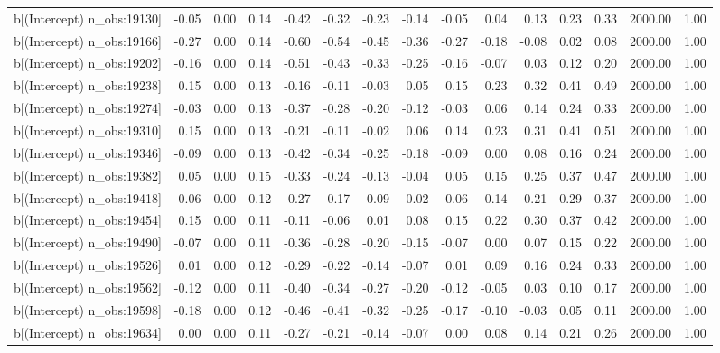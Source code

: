 \begin{table}[ht]
\begin{tabular}{rrrrrrrrrrrrrrr}
  b[(Intercept) n\_obs:19130] & -0.05 & 0.00 & 0.14 & -0.42 & -0.32 & -0.23 & -0.14 & -0.05 & 0.04 & 0.13 & 0.23 & 0.33 & 2000.00 & 1.00 \\ 
  b[(Intercept) n\_obs:19166] & -0.27 & 0.00 & 0.14 & -0.60 & -0.54 & -0.45 & -0.36 & -0.27 & -0.18 & -0.08 & 0.02 & 0.08 & 2000.00 & 1.00 \\ 
  b[(Intercept) n\_obs:19202] & -0.16 & 0.00 & 0.14 & -0.51 & -0.43 & -0.33 & -0.25 & -0.16 & -0.07 & 0.03 & 0.12 & 0.20 & 2000.00 & 1.00 \\ 
  b[(Intercept) n\_obs:19238] & 0.15 & 0.00 & 0.13 & -0.16 & -0.11 & -0.03 & 0.05 & 0.15 & 0.23 & 0.32 & 0.41 & 0.49 & 2000.00 & 1.00 \\ 
  b[(Intercept) n\_obs:19274] & -0.03 & 0.00 & 0.13 & -0.37 & -0.28 & -0.20 & -0.12 & -0.03 & 0.06 & 0.14 & 0.24 & 0.33 & 2000.00 & 1.00 \\ 
  b[(Intercept) n\_obs:19310] & 0.15 & 0.00 & 0.13 & -0.21 & -0.11 & -0.02 & 0.06 & 0.14 & 0.23 & 0.31 & 0.41 & 0.51 & 2000.00 & 1.00 \\ 
  b[(Intercept) n\_obs:19346] & -0.09 & 0.00 & 0.13 & -0.42 & -0.34 & -0.25 & -0.18 & -0.09 & 0.00 & 0.08 & 0.16 & 0.24 & 2000.00 & 1.00 \\ 
  b[(Intercept) n\_obs:19382] & 0.05 & 0.00 & 0.15 & -0.33 & -0.24 & -0.13 & -0.04 & 0.05 & 0.15 & 0.25 & 0.37 & 0.47 & 2000.00 & 1.00 \\ 
  b[(Intercept) n\_obs:19418] & 0.06 & 0.00 & 0.12 & -0.27 & -0.17 & -0.09 & -0.02 & 0.06 & 0.14 & 0.21 & 0.29 & 0.37 & 2000.00 & 1.00 \\ 
  b[(Intercept) n\_obs:19454] & 0.15 & 0.00 & 0.11 & -0.11 & -0.06 & 0.01 & 0.08 & 0.15 & 0.22 & 0.30 & 0.37 & 0.42 & 2000.00 & 1.00 \\ 
  b[(Intercept) n\_obs:19490] & -0.07 & 0.00 & 0.11 & -0.36 & -0.28 & -0.20 & -0.15 & -0.07 & 0.00 & 0.07 & 0.15 & 0.22 & 2000.00 & 1.00 \\ 
  b[(Intercept) n\_obs:19526] & 0.01 & 0.00 & 0.12 & -0.29 & -0.22 & -0.14 & -0.07 & 0.01 & 0.09 & 0.16 & 0.24 & 0.33 & 2000.00 & 1.00 \\ 
  b[(Intercept) n\_obs:19562] & -0.12 & 0.00 & 0.11 & -0.40 & -0.34 & -0.27 & -0.20 & -0.12 & -0.05 & 0.03 & 0.10 & 0.17 & 2000.00 & 1.00 \\ 
  b[(Intercept) n\_obs:19598] & -0.18 & 0.00 & 0.12 & -0.46 & -0.41 & -0.32 & -0.25 & -0.17 & -0.10 & -0.03 & 0.05 & 0.11 & 2000.00 & 1.00 \\ 
  b[(Intercept) n\_obs:19634] & 0.00 & 0.00 & 0.11 & -0.27 & -0.21 & -0.14 & -0.07 & 0.00 & 0.08 & 0.14 & 0.21 & 0.26 & 2000.00 & 1.00 \\ 

\end{tabular}
\end{table}
